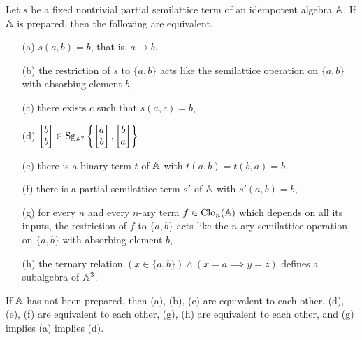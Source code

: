 \documentclass[letterpaper,11pt]{article}
\DeclareMathOperator{\Clo}{Clo}
\DeclareMathOperator{\Sg}{Sg}
\begin{document}
\begin{thm} Let $s$ be a fixed nontrivial partial semilattice term of an idempotent algebra $\mathbb{A}$. If $\mathbb{A}$ is prepared, then the following are equivalent.
\begin{itemize}
\item[(a)] $s(a,b) = b$, that is, $a \rightarrow b$,

\item[(b)] the restriction of $s$ to $\{a,b\}$ acts like the semilattice operation on $\{a,b\}$ with absorbing element $b$,

\item[(c)] there exists $c$ such that $s(a,c) = b$,

\item[(d)] $\begin{bmatrix}b \\ b\end{bmatrix} \in \Sg_{\bA^2}\left\{\begin{bmatrix}a \\ b\end{bmatrix}, \begin{bmatrix}b \\ a\end{bmatrix}\right\}$

\item[(e)] there is a binary term $t$ of $\mathbb{A}$ with $t(a,b) = t(b,a) = b$,

\item[(f)] there is a partial semilattice term $s'$ of $\mathbb{A}$ with $s'(a,b) = b$,

\item[(g)] for every $n$ and every $n$-ary term $f \in \Clo_n(\bA)$ which depends on all its inputs, the restriction of $f$ to $\{a,b\}$ acts like the $n$-ary semilattice operation on $\{a,b\}$ with absorbing element $b$,

\item[(h)] the ternary relation $(x \in \{a,b\}) \wedge (x = a \implies y = z)$ defines a subalgebra of $\mathbb{A}^3$.
\end{itemize}
If $\mathbb{A}$ has not been prepared, then (a), (b), (c) are equivalent to each other, (d), (e), (f) are equivalent to each other, (g), (h) are equivalent to each other, and (g) implies (a) implies (d).
\end{thm}
\end{document}
